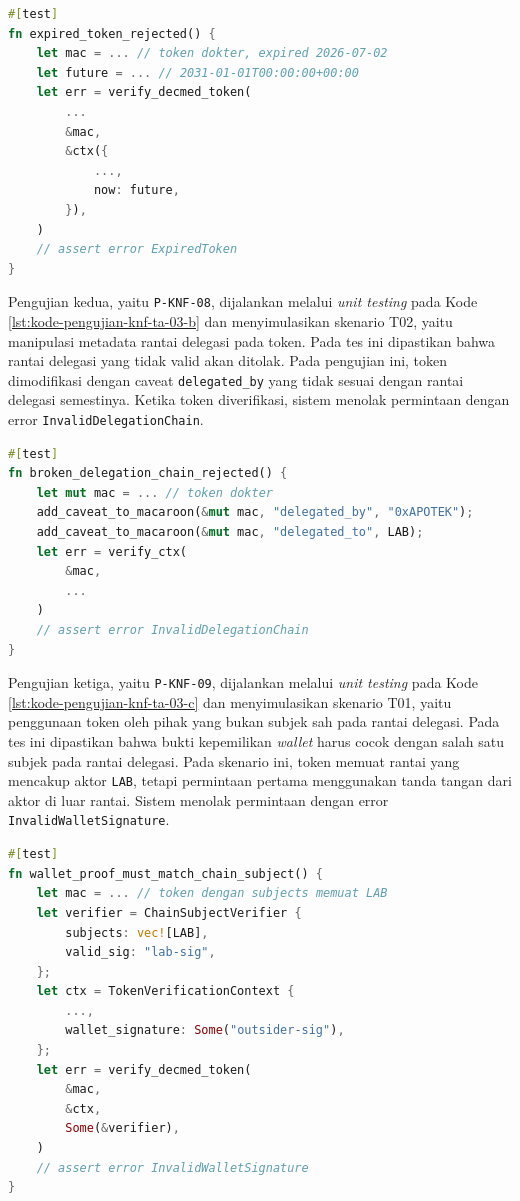 \documentclass[bahasa, 12pt, a4paper, onecolumn, oneside, final]{report}
\begin{document}
\begin{lstlisting}[language=Rust, caption=Pengujian P-KNF-07 untuk KNF-TA-03, label=lst:kode-pengujian-knf-ta-03-a]
#[test]
fn expired_token_rejected() {
    let mac = ... // token dokter, expired 2026-07-02
    let future = ... // 2031-01-01T00:00:00+00:00
    let err = verify_decmed_token(
		...
        &mac,
        &ctx({
            ...,
            now: future,
        }),
    )
    // assert error ExpiredToken
}
\end{lstlisting}

Pengujian kedua, yaitu \texttt{P-KNF-08}, dijalankan melalui \textit{unit testing} pada Kode \ref{lst:kode-pengujian-knf-ta-03-b} dan menyimulasikan skenario T02, yaitu manipulasi metadata rantai delegasi pada token. Pada tes ini dipastikan bahwa rantai delegasi yang tidak valid akan ditolak. Pada pengujian ini, token dimodifikasi dengan caveat \texttt{delegated\_by} yang tidak sesuai dengan rantai delegasi semestinya. Ketika token diverifikasi, sistem menolak permintaan dengan error \texttt{InvalidDelegationChain}.

\begin{lstlisting}[language=Rust, caption=Pengujian P-KNF-08 untuk KNF-TA-03, label=lst:kode-pengujian-knf-ta-03-b]
#[test]
fn broken_delegation_chain_rejected() {
    let mut mac = ... // token dokter
    add_caveat_to_macaroon(&mut mac, "delegated_by", "0xAPOTEK");
    add_caveat_to_macaroon(&mut mac, "delegated_to", LAB);
    let err = verify_ctx(
        &mac,
        ...
    )
    // assert error InvalidDelegationChain
}
\end{lstlisting}

Pengujian ketiga, yaitu \texttt{P-KNF-09}, dijalankan melalui \textit{unit testing} pada Kode \ref{lst:kode-pengujian-knf-ta-03-c} dan menyimulasikan skenario T01, yaitu penggunaan token oleh pihak yang bukan subjek sah pada rantai delegasi. Pada tes ini dipastikan bahwa bukti kepemilikan \textit{wallet} harus cocok dengan salah satu subjek pada rantai delegasi. Pada skenario ini, token memuat rantai yang mencakup aktor \texttt{LAB}, tetapi permintaan pertama menggunakan tanda tangan dari aktor di luar rantai. Sistem menolak permintaan dengan error \texttt{InvalidWalletSignature}.

\begin{lstlisting}[language=Rust, caption=Pengujian P-KNF-09 untuk KNF-TA-03 dan KNF-TA-06, label=lst:kode-pengujian-knf-ta-03-c]
#[test]
fn wallet_proof_must_match_chain_subject() {
    let mac = ... // token dengan subjects memuat LAB
    let verifier = ChainSubjectVerifier {
        subjects: vec![LAB],
        valid_sig: "lab-sig",
	};
    let ctx = TokenVerificationContext {
        ...,
        wallet_signature: Some("outsider-sig"),
    };
    let err = verify_decmed_token(
        &mac,
        &ctx,
        Some(&verifier),
    )
	// assert error InvalidWalletSignature
}
\end{lstlisting}
\end{document}
